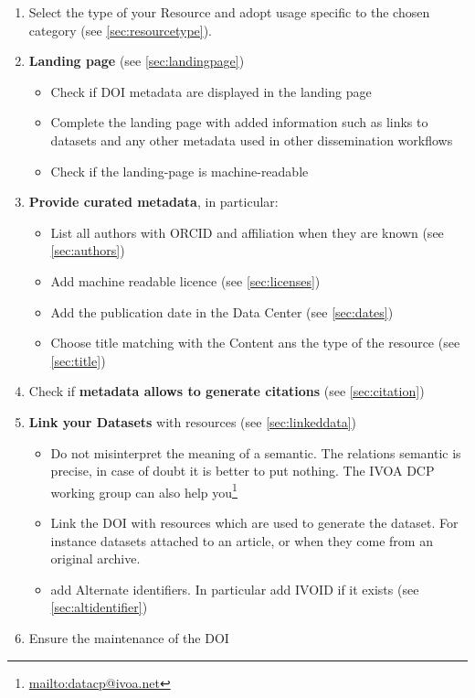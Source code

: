 \documentclass[11pt,a4paper]{ivoa}
\begin{document}
\begin{enumerate}
	\item Select the type of your Resource and adopt usage specific to the chosen category (see \ref{sec:resourcetype}).
	\item \textbf{Landing page} (see \ref{sec:landingpage})
	\begin{itemize}
		\item Check if DOI metadata are displayed in the landing page 
		\item Complete the landing page with added information such as links to datasets and any other metadata used in other dissemination workflows
		\item Check if the landing-page is machine-readable
	\end{itemize}
	\item \textbf{Provide curated metadata}, in particular:
	\begin{itemize}
		\item List all authors with ORCID and affiliation when they are known (see \ref{sec:authors})
		\item Add machine readable licence (see \ref{sec:licenses})
		\item Add the publication date in the Data Center (see \ref{sec:dates})
		\item Choose title  matching with the Content ans the type of the resource  (see \ref{sec:title})
	\end{itemize}
	\item Check if \textbf{metadata allows to generate citations} (see \ref{sec:citation})
	\item \textbf{Link your Datasets} with resources (see \ref{sec:linkeddata})
	\begin{itemize}	
		\item Do not misinterpret the meaning of a semantic. The relations semantic is precise, in case of doubt it is better to put nothing. 
		The IVOA DCP working group can also help you\footnote{\url{mailto:datacp@ivoa.net}}
		\item Link the DOI with resources which are used to generate the dataset. For instance datasets attached to an article, or when they come from an original archive.
		\item add Alternate identifiers. In particular add IVOID if it exists (see \ref{sec:altidentifier})
	\end{itemize}
	\item Ensure the maintenance of the DOI\\

\end{enumerate}
\end{document}
